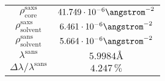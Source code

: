 \documentclass[\main/dresen_thesis.tex]{subfiles}
\begin{document}
\begin{table}[h]
\begin{tabular}{ c | l | l }
      \hline
      $\rho_\mathrm{core}^\mathrm{saxs}$
        & \multicolumn{2}{c}{$41.749 \cdot 10^{-6} \angstrom^{-2}$}\\
      $\rho_\mathrm{solvent}^\mathrm{saxs}$
        & \multicolumn{2}{c}{$6.461 \cdot 10^{-6} \angstrom^{-2}$}\\
      $\rho_\mathrm{solvent}^\mathrm{sans}$
        & \multicolumn{2}{c}{$5.664 \cdot 10^{-6} \angstrom^{-2}$}\\
      $\lambda^\mathrm{sans}$
        & \multicolumn{2}{c}{$5.9984 \unit{\angstrom}$}\\
      $\Delta \lambda / \lambda ^\mathrm{sans}$
        & \multicolumn{2}{c}{$4.247 \, \%$}\\
      \hline
    \end{tabular}
  \end{table}
\end{document}
